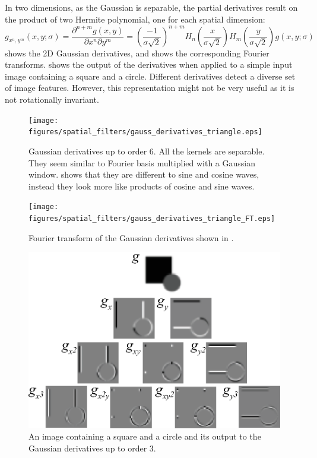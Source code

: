 In two dimensions, as the Gaussian is separable, the partial derivatives result on the product of two Hermite polynomial, one for each spatial dimension:
\begin{equation}
g_{x^n,y^m}(x,y; \sigma) =  
\frac{\partial^{n+m} g(x,y)}{\partial x^n \partial y^m}
= %
\left( \frac{-1}{\sigma \sqrt{2}} \right)^{n+m}
H_n\left( \frac{x}{\sigma \sqrt {2}} \right)
H_m\left( \frac{y}{\sigma \sqrt {2}} \right)
g(x,y; \sigma)
\label{eq:derivate2gauss2dhermite}
\end{equation}
\Fig{\ref{fig:gauss_derivatives_triangle}} shows the 2D Gaussian derivatives, and \fig{\ref{fig:gauss_derivatives_triangle_FT}} shows the corresponding Fourier transforms.
\Fig{\ref{fig:gauss_derivatives_mondrian}} shows the output of the derivatives when applied to a simple input image containing a square and a circle. Different derivatives detect a diverse set of image features. However, this representation might not be very useful as it is not rotationally invariant. 


\begin{figure}[t]
\centerline{
\texttt{[image: figures/spatial\_filters/gauss\_derivatives\_triangle.eps]}}
\caption{Gaussian derivatives up to order 6. All the kernels are separable. They seem similar to Fourier basis multiplied with a Gaussian window.   
\Fig{\ref{fig:gauss_derivatives_triangle_FT}} shows that they are different to sine and cosine waves, instead they look more like products of cosine and sine waves.} 
\label{fig:gauss_derivatives_triangle}
\end{figure}


\begin{figure}[t]
\centerline{
\texttt{[image: figures/spatial\_filters/gauss\_derivatives\_triangle\_FT.eps]}}
\caption{Fourier transform of the Gaussian derivatives shown in \fig{\ref{fig:gauss_derivatives_triangle}}.} 
\label{fig:gauss_derivatives_triangle_FT}
\end{figure}


\begin{figure}[t]
\centerline{
\includegraphics[width=0.8\linewidth]{figures/derivatives/fig_gauss_derivatives_triangle_mondrian.eps}}
\caption{An image containing a square and a circle and its output to the Gaussian derivatives up to order 3.} 
\label{fig:gauss_derivatives_mondrian}
\end{figure}


